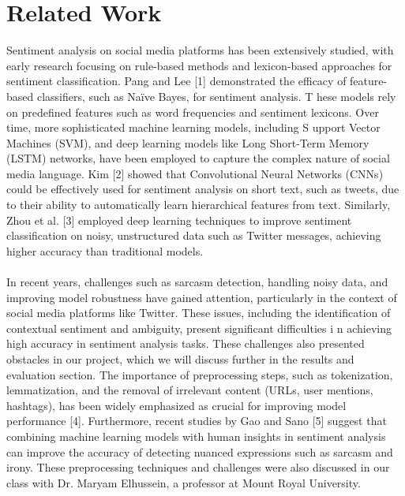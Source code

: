 \documentclass[conference]{IEEEtran}
\begin{document}
\section{Related Work}
Sentiment analysis on social media platforms has been extensively studied, with early research focusing on rule-based methods and lexicon-based approaches 
for sentiment classification. Pang and Lee [1] demonstrated the efficacy of feature-based classifiers, such as Naïve Bayes, for sentiment analysis. T
hese models rely on predefined features such as word frequencies and sentiment lexicons. Over time, more sophisticated machine learning models, including S
upport Vector Machines (SVM), and deep learning models like Long Short-Term Memory (LSTM) networks, have been employed to capture the complex nature of 
social media language. Kim [2] showed that Convolutional Neural Networks (CNNs) could be effectively used for sentiment analysis on short text, such as tweets, 
due to their ability to automatically learn hierarchical features from text. Similarly, Zhou et al. [3] employed deep learning techniques to improve sentiment 
classification on noisy, unstructured data such as Twitter messages, achieving higher accuracy than traditional models.
\\
\\
In recent years, challenges such as sarcasm detection, handling noisy data, and improving model robustness have gained attention, particularly in the context
 of social media platforms like Twitter. These issues, including the identification of contextual sentiment and ambiguity, present significant difficulties i
 n achieving high accuracy in sentiment analysis tasks. These challenges also presented obstacles in our project, which we will discuss further in the results 
 and evaluation section. The importance of preprocessing steps, such as tokenization, lemmatization, and the removal of irrelevant content (URLs, user mentions, 
 hashtags), has been widely emphasized as crucial for improving model performance [4]. Furthermore, recent studies by Gao and Sano [5] suggest that combining machine 
 learning models with human insights in sentiment analysis can improve the accuracy of detecting nuanced expressions such as sarcasm and irony. These preprocessing 
 techniques and challenges were also discussed in our class with Dr. Maryam Elhussein, a professor at Mount Royal University.
 \\
\end{document}
